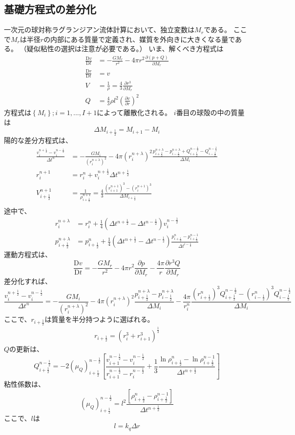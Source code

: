 \documentclass[a4j, dvipdfmx]{jsarticle}
\newcommand{\pder}[2][]{\frac{\partial#1}{\partial#2}}
\newcommand{\Dder}[2][]{\frac{\mathrm{D}#1}{\mathrm{D}#2}}
\newcommand{\half}{\frac{1}{2}}
\newcommand{\hpn}{n + \half}
\newcommand{\hmn}{n - \half}
\newcommand{\hpi}{i + \half}
\newcommand{\hmi}{i - \half}
\newcommand{\beq}{\begin{equation}}
\newcommand{\eeq}{\end{equation}}
\begin{document}
\subsection{基礎方程式の差分化}
一次元の球対称ラグランジアン流体計算において、独立変数は$M_r$である。
ここで$M_r$は半径$r$の内部にある質量で定義され、媒質を外向きに大きくなる量である。
（疑似粘性の選択は注意が必要である。）
いま、解くべき方程式は
\begin{align}
    \Dder[v]{t} &= - \frac{GM_r}{r^2} - 4\pi r^2\pder[(p + Q)]{M_r}\\
    \Dder[r]{t} &= v\\
    V &= \frac{1}{\rho}=\frac{4}{3}\pder[r^3]{M_r}\\
    Q &= \frac{4}{3}\rho l^2 (\pder[v]{r})^2\label{eq:q}
\end{align}
方程式は$\left\{M_i\right\};i = 1,...,I+1$によって離散化される。
$i$番目の球殻の中の質量は
\beq
    \Delta M_{i+\half} = M_{i+1} - M_i
\eeq
陽的な差分方程式は、
\begin{align}
    \frac{v^{n+\half}_i - v^{n-\half}_i}{\Delta t^n} &= -\frac{GM_i}{(r^{n+\lambda}_i)^2}
    -4\pi(r^{n+\lambda}_i)^2
    \frac{p^{n+\lambda}_{i+\half} - p^{n+\lambda}_{i-\half}+Q^{n-\half}_{i+\half} - Q^{n-\half}_{i-\half}}{\Delta M_i}\\
    r^{n+1}_i &= r^{n}_i + v^{\hpn}_i \Delta t^{\hpn}\\
    V^{n+1}_{\hpi} &= \frac{1}{\rho^{n+1}_{\hpi}}=\frac{4}{3}\frac{(r^{n+1}_{i+1})^3 - (r^{n+1}_{i})^3}{\Delta M_{\hpi}}\\
\end{align}
途中で、
\begin{align}
    r^{n+\lambda}_i &= r^n_i + \frac{1}{4} (\Delta t^{n+\half} - \Delta t^{n-\half})v^{n-\half}_i\\
    p^{n+\lambda}_{\hpi} &=  p^{n}_{\hpi} + \frac{1}{4} (\Delta t^{n+\half} - \Delta t^{n-\half})
    \frac{p^{n}_{\hpi} - p^{n-1}_{\hpi}}{\Delta t^{\hmi}}
\end{align}
運動方程式は、
\beq
    \Dder[v]{t} = - \frac{GM_r}{r^2} - 4\pi r^2\pder[p]{M_r} - \frac{4\pi}{r}\pder[r^3Q]{M_r}
\eeq
差分化すれば、
\beq
    \frac{v^{n+\half}_i - v^{n-\half}_i}{\Delta t^n} =
    -\frac{GM_i}{(r^{n+\lambda}_i)^2}
    -4\pi(r^{n+\lambda}_i)^2
    \frac{p^{n+\lambda}_{i+\half} - p^{n+\lambda}_{i-\half}}{\Delta M_i}
    -\frac{4\pi}{r^{n}_i}
    \frac{(r^{n}_{i+\half})^3Q^{n-\half}_{i+\half} - (r^{n}_{i-\half})^3Q^{n-\half}_{i-\half}}{\Delta M_i}
\eeq
ここで、$r_{i+\half}$は質量を半分持つように選ばれる。
\begin{align}
    r_{i+\half} = (r^3_i + r^3_{i+1})^{\frac{1}{3}}
\end{align}
$Q$の更新は、
\beq
    Q^{\hmn}_{\hpi} = - 2 (\mu_Q)^{\hmn}_{\hpi}
     \left[\frac{v^{\hmn}_{i+1}-v^{\hmn}_{i}}{r^{\hmn}_{i+1}-r^{\hmn}_{i}}
      +\frac{1}{3}\frac{\ln \rho^{n}_{\hpi} - \ln \rho^{n-1}_{\hpi}}{\Delta t^{\hpn}}\right]
\eeq
粘性係数は、
\beq
    (\mu_Q)^{n-\half}_{i+\half} = 
    l^2 \frac{\left[ \rho^n_{\hpi} - \rho^{n-1}_{\hpi}\right]}{\Delta t^{\hpn}}
\eeq
ここで、$l$は
\beq
    l = k_q \Delta r
\eeq
\end{document}
